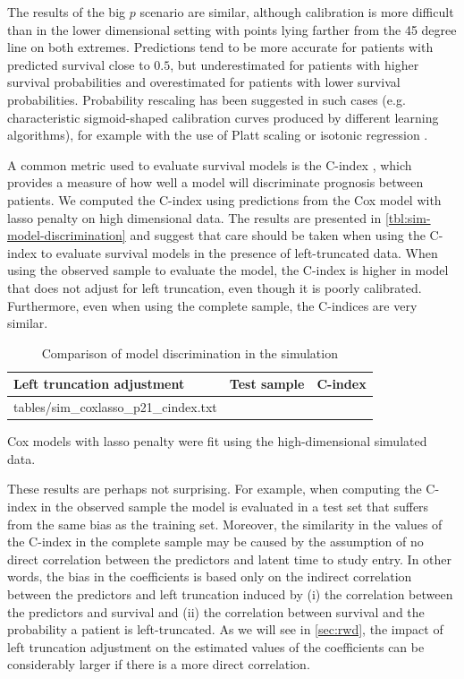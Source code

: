\documentclass[11pt,final,fleqn]{article}\usepackage[]{graphicx}\usepackage[]{color}
\makeatletter
\theoremstyle{plain}
\newcommand*\ExpandableInput[1]{\@@input#1 }
\makeatother
\begin{document}
The results of the big $p$ scenario are similar, although calibration is more difficult than in the lower dimensional setting with points lying farther from the 45 degree line on both extremes. Predictions tend to be more accurate for patients with predicted survival close to $0.5$, but underestimated for patients with higher survival probabilities and overestimated for patients with lower survival probabilities. Probability rescaling has been suggested in such cases (e.g. characteristic sigmoid-shaped calibration curves produced by different learning algorithms), for example with the use of Platt scaling \citep{platt1999scaling} or isotonic regression \citep{niculescu2005isotonic}.

A common metric used to evaluate survival models is the C-index \citep{harrell1996multivariable}, which provides a measure of how well a model will discriminate prognosis between patients. We computed the C-index using predictions from the Cox model with lasso penalty on high dimensional data. The results are presented in \autoref{tbl:sim-model-discrimination} and suggest that care should be taken when using the C-index to evaluate survival models in the presence of left-truncated data. When using the observed sample to evaluate the model, the C-index is higher in model that does not adjust for left truncation, even though it is poorly calibrated. Furthermore, even when using the complete sample, the C-indices are very similar. 

\begin{table}[!ht]
\begin{center}
\begin{threeparttable}
\caption{Comparison of model discrimination in the simulation} \label{tbl:sim-model-discrimination}
\begin{tabularx}{.7\textwidth}{@{\extracolsep{\fill}}llr}
\hline
\multicolumn{1}{l}{Left truncation adjustment} & \multicolumn{1}{l}{Test sample} & \multicolumn{1}{l}{C-index} \\
\hline
\ExpandableInput{tables/sim_coxlasso_p21_cindex.txt}
\hline
\end{tabularx}
\scriptsize Cox models with lasso penalty were fit using the high-dimensional simulated data.
\end{threeparttable}
\end{center}
\end{table}

These results are perhaps not surprising. For example, when computing the C-index in the observed sample the model is evaluated in a test set that suffers from the same bias as the training set. Moreover, the similarity in the values of the C-index in the complete sample may be caused by the assumption of no direct correlation between the predictors and latent time to study entry. In other words, the bias in the coefficients is based only on the indirect correlation between the predictors and left truncation induced by (i) the correlation between the predictors and survival and (ii) the correlation between survival and the probability a patient is left-truncated. As we will see in \autoref{sec:rwd}, the impact of left truncation adjustment on the estimated values of the coefficients can be considerably larger if there is a more direct correlation. 
\end{document}
